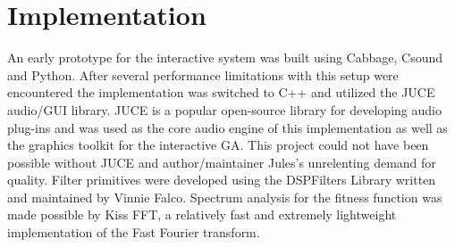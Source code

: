 \documentclass[12pt]{article}
\begin{document}
\begin{comment}
\subsection{Experimental Setup}
\subsubsection{Method}
This experiment will use genetic programming to evolve synthesis algorithms directly, utilizing any set of primitives that the user chooses. The inputs to this system will be the user-selected primitives and the output will be multiple SSA's for the user to modify and evaluate. The user will be able to step through the evolutionary process, assigning fitness and auditioning the produced SSA's using a MIDI keyboard or virtual MIDI keyboard. The user may manipulate any variable constants of the produced SSA. The user may opt to input an audio file and let the synthesizer attempt to evolve towards it. The user may also let evolution experiment randomly using novelty search with unencountered fundamental/partial frequency ratios as the novelty goal.
\subsubsection{Results}
\subsubsection{Identified Limitations}
\subsubsection{Conclusions}
\subsubsection{Parameters}

\end{comment}

\section{Implementation}
An early prototype for the interactive system was built using Cabbage, Csound and Python. After several performance limitations with this setup were encountered the implementation was switched to C++ and utilized the JUCE audio/GUI library. JUCE is a popular open-source library for developing audio plug-ins and was used as the core audio engine of this implementation as well as the graphics toolkit for the interactive GA. This project could not have been possible without JUCE and author/maintainer Jules's unrelenting demand for quality. Filter primitives were developed using the DSPFilters Library written and maintained by Vinnie Falco. Spectrum analysis for the fitness function was made possible by Kiss FFT, a relatively fast and extremely lightweight implementation of the Fast Fourier transform.
	
\end{document}
